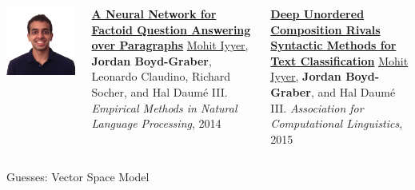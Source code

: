 \documentclass[compress]{beamer}
\newcommand{\gfxq}[2]{
\begin{center}
	\texttt{[image: qb/\#1]}
\end{center}
}
\begin{document}
\begin{frame}{}

  \begin{columns}
        \includegraphics[width=0.9\linewidth]{general_figures/mohit}
        \begin{block}{ {\bf \href{http://cs.colorado.edu/~jbg//docs/2014_emnlp_qb_rnn.pdf}{A Neural Network for Factoid Question Answering over Paragraphs}}}
\underline{\href{http://cs.umd.edu/~miyyer/}{Mohit Iyyer}}, {\bf Jordan Boyd-Graber}, Leonardo Claudino, Richard Socher, and Hal {Daum\'{e} III}.  \emph{Empirical Methods in Natural Language Processing}, 2014
        \end{block}
        
	\begin{block}{ {\bf \href{http://cs.colorado.edu/~jbg//docs/2015_acl_dan.pdf}{Deep Unordered Composition Rivals Syntactic Methods for Text Classification}} }
	\underline{\href{http://cs.umd.edu/~miyyer/}{Mohit Iyyer}}, {\bf Jordan Boyd-Graber}, and Hal {Daum\'{e} III}.  \emph{Association for Computational Linguistics}, 2015
	
	\end{block}        
        
  \end{columns}
\end{frame}


\begin{frame}{Guesses: Vector Space Model}


  \only<1>{\gfxq{unigram_models_2}{.9}}
  \only<2>{\gfxq{unigram_models_3}{.9}}
  \only<3>{\gfxq{unigram_models_4}{.9}}
  \only<4>{\gfxq{unigram_models_5}{.9}}
  \only<5>{\gfxq{unigram_models_6}{.9}}
  \only<6>{\gfxq{unigram_models_7}{.9}}
  \only<7>{\gfxq{unigram_models_8}{.9}}


\end{frame}
\end{document}
